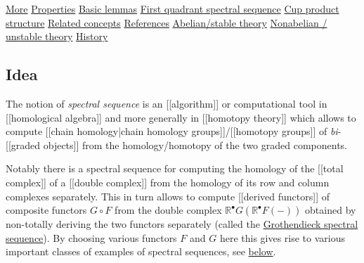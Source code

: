 \documentclass[12pt,titlepage]{article}
\theoremstyle{plain}
\theoremstyle{definition}
\theoremstyle{remark}
\begin{document}
\noindent\hyperlink{more}{More}\dotfill \pageref*{more} \linebreak
\noindent\hyperlink{properties}{Properties}\dotfill \pageref*{properties} \linebreak
\noindent\hyperlink{basic_lemmas}{Basic lemmas}\dotfill \pageref*{basic_lemmas} \linebreak
\noindent\hyperlink{FirstQuadrant}{First quadrant spectral sequence}\dotfill \pageref*{FirstQuadrant} \linebreak
\noindent\hyperlink{PropertiesCupProductStructure}{Cup product structure}\dotfill \pageref*{PropertiesCupProductStructure} \linebreak
\noindent\hyperlink{related_concepts}{Related concepts}\dotfill \pageref*{related_concepts} \linebreak
\noindent\hyperlink{references}{References}\dotfill \pageref*{references} \linebreak
\noindent\hyperlink{abelianstable_theory}{Abelian/stable theory}\dotfill \pageref*{abelianstable_theory} \linebreak
\noindent\hyperlink{ReferencesNonabelian}{Nonabelian / unstable theory}\dotfill \pageref*{ReferencesNonabelian} \linebreak
\noindent\hyperlink{history}{History}\dotfill \pageref*{history} \linebreak


\hypertarget{Idea}{}\subsection*{{Idea}}\label{Idea}

The notion of \emph{spectral sequence} is an [[algorithm]] or computational tool in [[homological algebra]] and more generally in [[homotopy theory]] which allows to compute [[chain homology|chain homology groups]]/[[homotopy groups]] of \emph{bi}-[[graded objects]] from the homology/homotopy of the two graded components.

Notably there is a spectral sequence for computing the homology of the [[total complex]] of a [[double complex]] from the homology of its row and column complexes separately. This in turn allows to compute [[derived functors]] of composite functors $G\circ F$ from the double complex $\mathbb{R}^\bullet G (\mathbb{R}^\bullet F(-))$ obtained by non-totally deriving the two functors separately (called the \hyperlink{GrothendieckSpectralSequence}{Grothendieck spectral sequence}). By choosing various functors $F$ and $G$ here this gives rise to various important classes of examples of spectral sequences, see \hyperlink{SpecialGrothendieckSpectralSequence}{below}.
\end{document}
